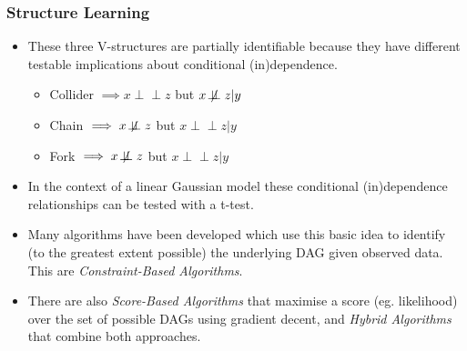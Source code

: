 \documentclass{beamer}
\def\indep{\perp \!\!\! \perp}
\begin{document}
\begin{frame}
    \frametitle{Structure Learning}
    \begin{itemize}
        \item These three V-structures are partially identifiable because they have different testable implications about conditional (in)dependence.
        \begin{itemize}
            \item Collider $\implies x \indep z$ but $x \not\!\indep z | y$
            \item Chain $\implies x \not\!\indep z$ but $x \indep z | y$
            \item Fork $\implies x \not\!\indep z$ but $x \indep z | y$
        \end{itemize}
        \item In the context of a linear Gaussian model these conditional (in)dependence relationships can be tested with a t-test.
        \item Many algorithms have been developed which use this basic idea to identify (to the greatest extent possible) the underlying DAG given observed data. This are \textit{Constraint-Based Algorithms}.
        \item There are also \textit{Score-Based Algorithms} that maximise a score (eg. likelihood) over the set of possible DAGs using gradient decent, and \textit{Hybrid Algorithms} that combine both approaches.
    \end{itemize}
\end{frame}
\end{document}
